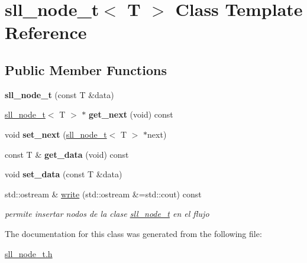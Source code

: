 \hypertarget{classsll__node__t}{}\section{sll\+\_\+node\+\_\+t$<$ T $>$ Class Template Reference}
\label{classsll__node__t}
\subsection*{Public Member Functions}
\begin{DoxyCompactItemize}
\item 
\mbox{\label{classsll__node__t_ac8431b20f7fec9a1c83f172b3faa3b96}} 
{\bfseries sll\+\_\+node\+\_\+t} (const T \&data)
\item 
\mbox{\label{classsll__node__t_af80f0ef9f43952e1464dd8cf41ef60ab}} 
\hyperlink{classsll__node__t}{sll\+\_\+node\+\_\+t}$<$ T $>$ $\ast$ {\bfseries get\+\_\+next} (void) const
\item 
\mbox{\label{classsll__node__t_a713e6dd13968bcfd42ed4cdc628ce82d}} 
void {\bfseries set\+\_\+next} (\hyperlink{classsll__node__t}{sll\+\_\+node\+\_\+t}$<$ T $>$ $\ast$next)
\item 
\mbox{\label{classsll__node__t_afb48b70324626e29a5b2471f0086090c}} 
const T \& {\bfseries get\+\_\+data} (void) const
\item 
\mbox{\label{classsll__node__t_a7a6ec1d7b98c398d72a3c4fc911da70a}} 
void {\bfseries set\+\_\+data} (const T \&data)
\item 
\mbox{\label{classsll__node__t_a453a85b5952a6fccb8524a8c4550df36}} 
std\+::ostream \& \hyperlink{classsll__node__t_a453a85b5952a6fccb8524a8c4550df36}{write} (std\+::ostream \&=std\+::cout) const
\begin{DoxyCompactList}\small\item\em permite insertar nodos de la clase \hyperlink{classsll__node__t}{sll\+\_\+node\+\_\+t} en el flujo \end{DoxyCompactList}\end{DoxyCompactItemize}


The documentation for this class was generated from the following file\+:\begin{DoxyCompactItemize}
\item 
\hyperlink{sll__node__t_8h}{sll\+\_\+node\+\_\+t.\+h}\end{DoxyCompactItemize}
